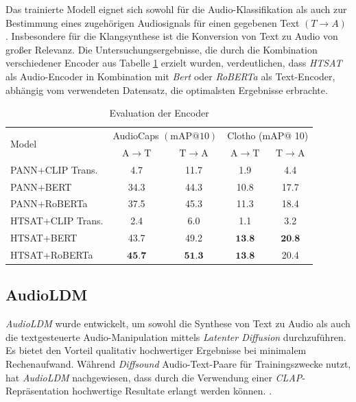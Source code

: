 \documentclass[
  a4paper,  %
  twoside,  %
  bibliography=totoc,
  headsepline,
  cleardoublepage=empty,
  parskip=half,
  draft=false
]{scrbook}
\begin{document}
Das trainierte Modell eignet sich sowohl für die Audio-Klassifikation als auch zur Bestimmung eines zugehörigen Audiosignals für einen gegebenen Text $(T\rightarrow A)$ \cite{wu_large-scale_2023}. Insbesondere für die Klangsynthese ist die Konversion von Text zu Audio von großer Relevanz. Die Untersuchungsergebnisse, die durch die Kombination verschiedener Encoder aus Tabelle \ref{tab:Clap} erzielt wurden, verdeutlichen, dass \emph{HTSAT} \cite{chen_hts-at_2022} als Audio-Encoder in Kombination mit \emph{Bert} \cite{devlin_bert_2019} oder \emph{RoBERTa} \cite{liu_roberta_2019} als Text-Encoder, abhängig vom verwendeten Datensatz, die optimalsten Ergebnisse erbrachte. \cite{wu_large-scale_2023}

\begin{table}[h]
  \centering
\begin{tabular}{lcc|cc}
\hline \multirow{2}{*}{ Model } & \multicolumn{2}{c|}{ AudioCaps $(\mathrm{mAP} @ 10)$} & \multicolumn{2}{c}{ Clotho (mAP@ 10) } \\
\cline { 2 - 5 } & $\mathrm{A} \rightarrow \mathrm{T}$ & $\mathrm{T} \rightarrow \mathrm{A}$ & $\mathrm{A} \rightarrow \mathrm{T}$ & $\mathrm{T} \rightarrow \mathrm{A}$ \\
\hline PANN+CLIP Trans. & 4.7 & 11.7 & 1.9 & 4.4 \\
PANN+BERT & 34.3 & 44.3 & 10.8 & 17.7 \\
PANN+RoBERTa & 37.5 & 45.3 & 11.3 & 18.4 \\
HTSAT+CLIP Trans. & 2.4 & 6.0 & 1.1 & 3.2 \\
HTSAT+BERT & 43.7 & 49.2 & $\mathbf{1 3 . 8}$ & $\mathbf{2 0 . 8}$ \\
HTSAT+RoBERTa & $\mathbf{4 5 . 7}$ & $\mathbf{5 1 . 3}$ & $\mathbf{1 3 . 8}$ & 20.4 \\
\hline
\end{tabular}
\caption[Encoder CLAP]{Evaluation der Encoder \cite{wu_large-scale_2023}}
  \label{tab:Clap}
\end{table}

\subsection{AudioLDM}
\label{sec:AudioLDM}

\emph{AudioLDM} \cite{liu_audioldm_2023} wurde entwickelt, um sowohl die Synthese von Text zu Audio als auch die textgesteuerte Audio-Manipulation mittels \emph{Latenter Diffusion} \cite{rombach_high-resolution_2022} durchzuführen. Es bietet den Vorteil qualitativ hochwertiger Ergebnisse bei minimalem Rechenaufwand. Während \emph{Diffsound} \cite{yang_diffsound_2023} Audio-Text-Paare für Trainingszwecke nutzt, hat \emph{AudioLDM} nachgewiesen, dass durch die Verwendung einer \emph{CLAP}-Repräsentation \cite{wu_large-scale_2023} hochwertige Resultate erlangt werden können. \cite{liu_audioldm_2023}.
\end{document}
